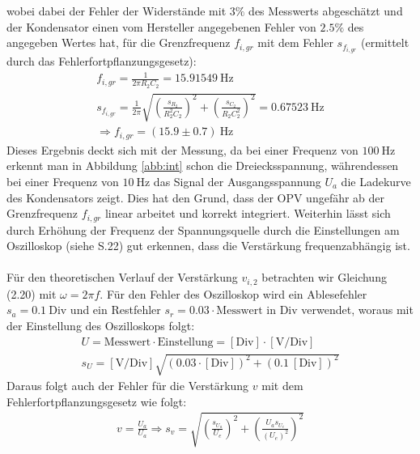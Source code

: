 wobei dabei der Fehler der Widerstände mit $3\%$ des Messwerts abgeschätzt und der Kondensator einen vom Hersteller angegebenen Fehler von $2.5\%$ des angegeben Wertes hat, für die Grenzfrequenz $f_{i,gr}$ mit dem Fehler $s_{f_{i,gr}}$ (ermittelt durch das Fehlerfortpflanzungsgesetz):
\begin{gather}
    f_{i,gr} = \frac{1}{2\pi R_2 C_2} = 15.91549~\text{Hz}\\[0.5cm]
    s_{f_{i,gr}} = \frac{1}{2\pi}\sqrt{\left(\frac{s_{R_2}}{R_2^2 C_2}\right)^2 + \left(\frac{s_{C_2}}{R_2 C_2^2}\right)^2} = 0.67523~\text{Hz}\\[0.5cm]
    \Rightarrow \boxed{f_{i,gr} = (15.9 \pm 0.7)~\text{Hz}}
\end{gather}
Dieses Ergebnis deckt sich mit der Messung, da bei einer Frequenz von $100~\text{Hz}$ erkennt man in Abbildung \ref{abb:int} schon die Dreiecksspannung, währendessen bei einer Frequenz von $10~\text{Hz}$ das Signal der Ausgangsspannung $U_a$ die Ladekurve des Kondensators zeigt. Dies hat den Grund, dass der OPV ungefähr ab der Grenzfrequenz $f_{i,gr}$ linear arbeitet und korrekt integriert. Weiterhin lässt sich durch Erhöhung der Frequenz der Spannungsquelle durch die Einstellungen am Oszilloskop (siehe S.22) gut erkennen, dass die Verstärkung frequenzabhängig ist.\\
 \\
Für den theoretischen Verlauf der Verstärkung $v_{i,2}$ betrachten wir Gleichung (2.20) mit $\omega = 2\pi f$.
Für den Fehler des Oszilloskop wird ein Ablesefehler $s_a = 0.1~\text{Div}$ und ein Restfehler $s_r = 0.03\cdot\text{Messwert in Div}$ verwendet, woraus mit der Einstellung des Oszilloskops folgt:
\begin{gather}
    U = \text{Messwert}\cdot\text{Einstellung} = [\text{Div}]\cdot[\text{V/Div}]\\
    s_U = [\text{V/Div}]\sqrt{(0.03\cdot [\text{Div}])^2 + (0.1~[\text{Div}])^2} 
\end{gather}
Daraus folgt auch der Fehler für die Verstärkung $v$ mit dem Fehlerfortpflanzungsgesetz wie folgt:
\begin{gather}
    v = \frac{U_a}{U_a} \Rightarrow s_v = \sqrt{\left(\frac{s_{U_a}}{U_e}\right)^2 + \left(\frac{U_a s_{U_e}}{(U_e)^2}\right)^2}
\end{gather}
